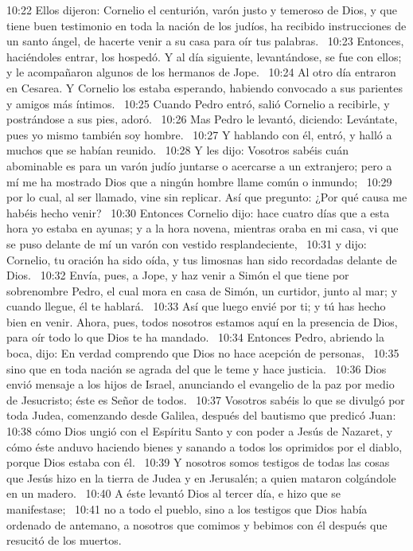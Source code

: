 10:22 Ellos dijeron: Cornelio el centurión, varón justo y temeroso de Dios, y que tiene buen testimonio en toda la nación de los judíos, ha recibido instrucciones de un santo ángel, de hacerte venir a su casa para oír tus palabras.  
10:23 Entonces, haciéndoles entrar, los hospedó. Y al día siguiente, levantándose, se fue con ellos; y le acompañaron algunos de los hermanos de Jope.  
10:24 Al otro día entraron en Cesarea. Y Cornelio los estaba esperando, habiendo convocado a sus parientes y amigos más íntimos.  
10:25 Cuando Pedro entró, salió Cornelio a recibirle, y postrándose a sus pies, adoró.  
10:26 Mas Pedro le levantó, diciendo: Levántate, pues yo mismo también soy hombre.  
10:27 Y hablando con él, entró, y halló a muchos que se habían reunido.  
10:28 Y les dijo: Vosotros sabéis cuán abominable es para un varón judío juntarse o acercarse a un extranjero; pero a mí me ha mostrado Dios que a ningún hombre llame común o inmundo;  
10:29 por lo cual, al ser llamado, vine sin replicar. Así que pregunto: ¿Por qué causa me habéis hecho venir?  
10:30 Entonces Cornelio dijo: hace cuatro días que a esta hora yo estaba en ayunas; y a la hora novena, mientras oraba en mi casa, vi que se puso delante de mí un varón con vestido resplandeciente,  
10:31 y dijo: Cornelio, tu oración ha sido oída, y tus limosnas han sido recordadas delante de Dios.  
10:32 Envía, pues, a Jope, y haz venir a Simón el que tiene por sobrenombre Pedro, el cual mora en casa de Simón, un curtidor, junto al mar; y cuando llegue, él te hablará.  
10:33 Así que luego envié por ti; y tú has hecho bien en venir. Ahora, pues, todos nosotros estamos aquí en la presencia de Dios, para oír todo lo que Dios te ha mandado.  
10:34 Entonces Pedro, abriendo la boca, dijo: En verdad comprendo que Dios no hace acepción de personas,  
10:35 sino que en toda nación se agrada del que le teme y hace justicia.  
10:36 Dios envió mensaje a los hijos de Israel, anunciando el evangelio de la paz por medio de Jesucristo; éste es Señor de todos.  
10:37 Vosotros sabéis lo que se divulgó por toda Judea, comenzando desde Galilea, después del bautismo que predicó Juan:  
10:38 cómo Dios ungió con el Espíritu Santo y con poder a Jesús de Nazaret, y cómo éste anduvo haciendo bienes y sanando a todos los oprimidos por el diablo, porque Dios estaba con él.  
10:39 Y nosotros somos testigos de todas las cosas que Jesús hizo en la tierra de Judea y en Jerusalén; a quien mataron colgándole en un madero.  
10:40 A éste levantó Dios al tercer día, e hizo que se manifestase;  
10:41 no a todo el pueblo, sino a los testigos que Dios había ordenado de antemano, a nosotros que comimos y bebimos con él después que resucitó de los muertos.  
